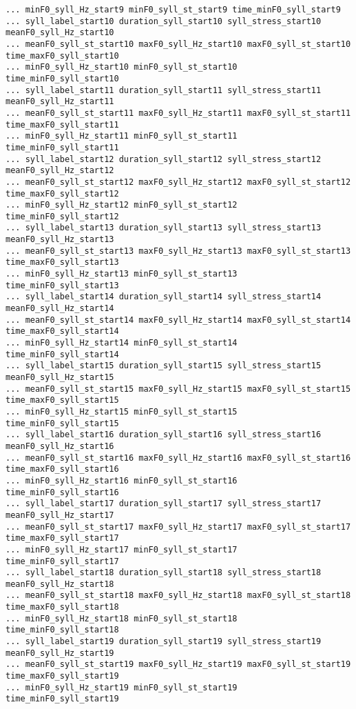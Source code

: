 \begin{Verbatim}[fontsize=\tiny]
... minF0_syll_Hz_start9 minF0_syll_st_start9 time_minF0_syll_start9
... syll_label_start10 duration_syll_start10 syll_stress_start10 meanF0_syll_Hz_start10 
... meanF0_syll_st_start10 maxF0_syll_Hz_start10 maxF0_syll_st_start10 time_maxF0_syll_start10 
... minF0_syll_Hz_start10 minF0_syll_st_start10 time_minF0_syll_start10
... syll_label_start11 duration_syll_start11 syll_stress_start11 meanF0_syll_Hz_start11 
... meanF0_syll_st_start11 maxF0_syll_Hz_start11 maxF0_syll_st_start11 time_maxF0_syll_start11 
... minF0_syll_Hz_start11 minF0_syll_st_start11 time_minF0_syll_start11
... syll_label_start12 duration_syll_start12 syll_stress_start12 meanF0_syll_Hz_start12 
... meanF0_syll_st_start12 maxF0_syll_Hz_start12 maxF0_syll_st_start12 time_maxF0_syll_start12 
... minF0_syll_Hz_start12 minF0_syll_st_start12 time_minF0_syll_start12
... syll_label_start13 duration_syll_start13 syll_stress_start13 meanF0_syll_Hz_start13 
... meanF0_syll_st_start13 maxF0_syll_Hz_start13 maxF0_syll_st_start13 time_maxF0_syll_start13 
... minF0_syll_Hz_start13 minF0_syll_st_start13 time_minF0_syll_start13
... syll_label_start14 duration_syll_start14 syll_stress_start14 meanF0_syll_Hz_start14 
... meanF0_syll_st_start14 maxF0_syll_Hz_start14 maxF0_syll_st_start14 time_maxF0_syll_start14 
... minF0_syll_Hz_start14 minF0_syll_st_start14 time_minF0_syll_start14
... syll_label_start15 duration_syll_start15 syll_stress_start15 meanF0_syll_Hz_start15 
... meanF0_syll_st_start15 maxF0_syll_Hz_start15 maxF0_syll_st_start15 time_maxF0_syll_start15 
... minF0_syll_Hz_start15 minF0_syll_st_start15 time_minF0_syll_start15
... syll_label_start16 duration_syll_start16 syll_stress_start16 meanF0_syll_Hz_start16 
... meanF0_syll_st_start16 maxF0_syll_Hz_start16 maxF0_syll_st_start16 time_maxF0_syll_start16 
... minF0_syll_Hz_start16 minF0_syll_st_start16 time_minF0_syll_start16
... syll_label_start17 duration_syll_start17 syll_stress_start17 meanF0_syll_Hz_start17 
... meanF0_syll_st_start17 maxF0_syll_Hz_start17 maxF0_syll_st_start17 time_maxF0_syll_start17 
... minF0_syll_Hz_start17 minF0_syll_st_start17 time_minF0_syll_start17
... syll_label_start18 duration_syll_start18 syll_stress_start18 meanF0_syll_Hz_start18 
... meanF0_syll_st_start18 maxF0_syll_Hz_start18 maxF0_syll_st_start18 time_maxF0_syll_start18 
... minF0_syll_Hz_start18 minF0_syll_st_start18 time_minF0_syll_start18
... syll_label_start19 duration_syll_start19 syll_stress_start19 meanF0_syll_Hz_start19 
... meanF0_syll_st_start19 maxF0_syll_Hz_start19 maxF0_syll_st_start19 time_maxF0_syll_start19 
... minF0_syll_Hz_start19 minF0_syll_st_start19 time_minF0_syll_start19

\end{Verbatim}

